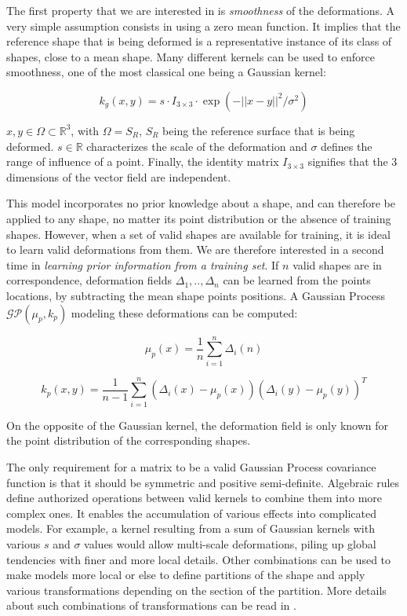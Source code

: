 The first property that we are interested in is \textit{smoothness} of the deformations. A very simple assumption consists in using a zero mean function. It implies that the reference shape that is being deformed is a representative instance of its class of shapes, close to a mean shape. Many different kernels can be used to enforce smoothness, one of the most classical one being a Gaussian kernel: 

\begin{equation}
	\label{eq:gaussian_kernel}
	k_g(x, y) = s \cdot I_{3\times3} \cdot \exp(-||x-y||^2/\sigma^2)
\end{equation} 

$x, y \in \Omega \subset \mathbb{R}^3$, with $\Omega = S_R$, $S_R$ being the reference surface that is being deformed. $s \in \mathbb{R}$ characterizes the scale of the deformation and $\sigma$ defines the range of influence of a point. Finally, the identity matrix $I_{3\times3}$ signifies that the 3 dimensions of the vector field are independent. 

This model incorporates no prior knowledge about a shape, and can therefore be applied to any shape, no matter its point distribution or the absence of training shapes. 
However, when a set of valid shapes are available for training, it is ideal to learn valid deformations from them. We are therefore interested in a second time in \textit{learning prior information from a training set}. If $n$ valid shapes are in correspondence, deformation fields $\Delta_1, .., \Delta_n$ can be learned from the points locations, by subtracting the mean shape points positions. A Gaussian Process $\mathcal{GP}(\mu_{p}, k_{p})$ modeling these deformations can be computed: 

\begin{equation}
	\mu_{p}(x) = \frac{1}{n} \sum_{i=1}^{n} \Delta_i(n)
\end{equation}

\begin{equation}
	k_p(x,y) = \frac{1}{n-1} \sum_{i=1}^{n} (\Delta_i(x)-\mu_p(x))(\Delta_i(y) - \mu_p(y))^T
\end{equation}

On the opposite of the Gaussian kernel, the deformation field is only known for the point distribution of the corresponding shapes. 


The only requirement for a matrix to be a valid Gaussian Process covariance function is that it should be symmetric and positive semi-definite. Algebraic rules define authorized operations between valid kernels to combine them into more complex ones. It enables the accumulation of various effects into complicated models. For example, a kernel resulting from a sum of Gaussian kernels with various $s$ and $\sigma$ values would allow multi-scale deformations, piling up global tendencies with finer and more local details. Other combinations can be used to make models more local or else to define partitions of the shape and apply various transformations depending on the section of the partition. More details about such combinations of transformations can be read in \cite{luthi_2017_gaussian}. 

